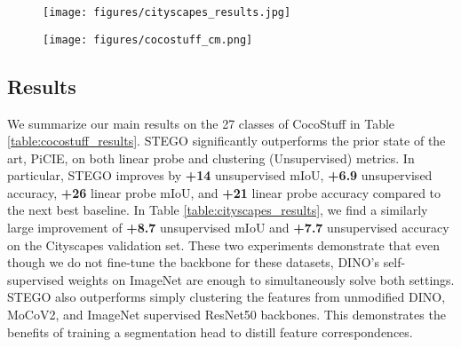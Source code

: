 \documentclass{article} \usepackage{iclr2022_conference,times}
\begin{document}
\begin{figure}[t]
\centering
\begin{minipage}{.58\textwidth}
  \centering
 \texttt{[image: figures/cityscapes\_results.jpg]}
 \vspace{-.3in}
    \label{fig:cityscapes_preds}
\end{minipage}\hfill
\begin{minipage}{.4\textwidth}
  \centering
    \texttt{[image: figures/cocostuff\_cm.png]}
     \vspace{-.3in}
  \label{fig:cocostuff_cm}
\end{minipage}
\end{figure} 

\subsection{Results}
\vspace{-.05in}

We summarize our main results on the 27 classes of CocoStuff in Table \ref{table:cocostuff_results}. STEGO significantly outperforms the prior state of the art, PiCIE, on both linear probe and clustering (Unsupervised) metrics. In particular, STEGO improves by \textbf{+14} unsupervised mIoU, \textbf{+6.9} unsupervised accuracy, \textbf{+26} linear probe mIoU, and \textbf{+21} linear probe accuracy compared to the next best baseline. In Table \ref{table:cityscapes_results}, we find a similarly large improvement of \textbf{+8.7} unsupervised mIoU and \textbf{+7.7} unsupervised accuracy on the Cityscapes validation set. These two experiments demonstrate that even though we do not fine-tune the backbone for these datasets, DINO's self-supervised weights on ImageNet \citep{imagenet} are enough to simultaneously solve both settings. STEGO also outperforms simply clustering the features from unmodified DINO, MoCoV2, and ImageNet supervised ResNet50 backbones. This demonstrates the benefits of training a segmentation head to distill feature correspondences. 
\end{document}
